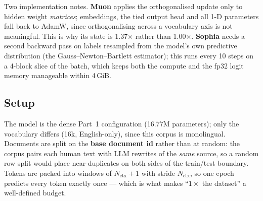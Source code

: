 \documentclass[11pt]{article}
\begin{document}
\begin{table}[t]
\centering
\caption{The five optimizers. ``State'' is the measured optimizer state as a
multiple of the fp32 model size.}
\label{tab:p2-impl}
\end{table}

\noindent
Two implementation notes. \textbf{Muon} applies the orthogonalised update only to
hidden weight \emph{matrices}; embeddings, the tied output head and all 1-D
parameters fall back to AdamW, since orthogonalising across a vocabulary axis is
not meaningful. This is why its state is 1.37$\times$ rather than 1.00$\times$.
\textbf{Sophia} needs a second backward pass on labels resampled from the model's
own predictive distribution (the Gauss--Newton--Bartlett estimator); this runs
every 10 steps on a 4-block slice of the batch, which keeps both the compute and
the fp32 logit memory manageable within 4\,GiB.

\subsection{Setup}

The model is the dense Part~1 configuration (16.77M parameters); only the
vocabulary differs (16k, English-only), since this corpus is monolingual.
Documents are split on the \textbf{base document id} rather than at random: the
corpus pairs each human text with LLM rewrites of the \emph{same} source, so a
random row split would place near-duplicates on both sides of the train/test
boundary. Tokens are packed into windows of $N_{\text{ctx}}+1$ with stride
$N_{\text{ctx}}$, so one epoch predicts every token exactly once --- which is
what makes ``$1\times$ the dataset'' a well-defined budget.
\end{document}
